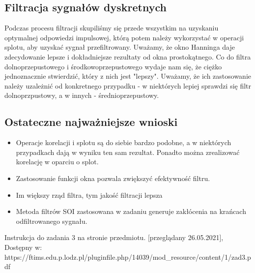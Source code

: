 \documentclass[12pt]{article}
\begin{document}
\subsection{Filtracja sygnałów dyskretnych}
Podczas procesu filtracji skupiliśmy się przede wszystkim na uzyskaniu optymalnej odpowiedzi impulsowej, którą potem należy wykorzystać w operacji splotu, aby uzyskać sygnał przefiltrowany. Uważamy, że okno Hanninga daje zdecydowanie lepsze i dokładniejsze rezultaty od okna prostokątnego. Co do filtra dolnoprzepustowego i środkowoprzepustowego wydaje nam się, że ciężko jednoznacznie stwierdzić, który z nich jest "lepszy". Uważamy, że ich zastosowanie należy uzależnić od konkretnego przypadku - w niektórych lepiej sprawdzi się filtr dolnoprzpustowy, a w innych - średnioprzepustowy.

\subsection{Ostateczne najważniejsze wnioski}
\begin{itemize}
    \item Operacje korelacji i splotu są do siebie bardzo podobne, a w niektórych przypadkach dają w wyniku ten sam rezultat. Ponadto można zrealizować korelację w oparciu o splot.
    \item Zastosowanie funkcji okna pozwala zwiększyć efektywność filtru.
    \item Im większy rząd filtra, tym jakość filtracji lepsza
    \item Metoda filtrów SOI zastosowana w zadaniu generuje zakłócenia na krańcach odfiltrowanego sygnału.
\end{itemize}
\begin{thebibliography}{}
 Instrukcja do zadania 3 na stronie przedmiotu. [przeglądany 26.05.2021], Dostępny w: https://ftims.edu.p.lodz.pl/pluginfile.php/14039/mod\_resource/content/1/zad3.pdf


\end{thebibliography}
\end{document}

